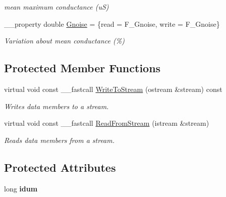 \begin{DoxyCompactItemize}
\begin{DoxyCompactList}\small\item\em mean maximum conductance (u\+S) \end{DoxyCompactList}\item 
\hypertarget{class_t_h_h_current_a62dbf34311e4c433d6bcfda9497982f9}{\+\_\+\+\_\+property double \hyperlink{class_t_h_h_current_a62dbf34311e4c433d6bcfda9497982f9}{Gnoise} = \{read = F\+\_\+\+Gnoise, write = F\+\_\+\+Gnoise\}}\label{class_t_h_h_current_a62dbf34311e4c433d6bcfda9497982f9}

\begin{DoxyCompactList}\small\item\em Variation about mean conductance (\%) \end{DoxyCompactList}\end{DoxyCompactItemize}
\subsection*{Protected Member Functions}
\begin{DoxyCompactItemize}
\item 
\hypertarget{class_t_h_h_current_a28afc4ddd30bbf6a44855c750a98dc8d}{virtual void const \+\_\+\+\_\+fastcall \hyperlink{class_t_h_h_current_a28afc4ddd30bbf6a44855c750a98dc8d}{Write\+To\+Stream} (ostream \&stream) const }\label{class_t_h_h_current_a28afc4ddd30bbf6a44855c750a98dc8d}

\begin{DoxyCompactList}\small\item\em Writes data members to a stream. \end{DoxyCompactList}\item 
\hypertarget{class_t_h_h_current_a9ade3361c30cf11880d13339f7ae1fad}{virtual void const \+\_\+\+\_\+fastcall \hyperlink{class_t_h_h_current_a9ade3361c30cf11880d13339f7ae1fad}{Read\+From\+Stream} (istream \&stream)}\label{class_t_h_h_current_a9ade3361c30cf11880d13339f7ae1fad}

\begin{DoxyCompactList}\small\item\em Reads data members from a stream. \end{DoxyCompactList}\end{DoxyCompactItemize}
\subsection*{Protected Attributes}
\begin{DoxyCompactItemize}
\item 
\hypertarget{class_t_h_h_current_a8938eaa4d33700d8b2de8a2b7ef918e9}{long {\bfseries idum}}\label{class_t_h_h_current_a8938eaa4d33700d8b2de8a2b7ef918e9}

\end{DoxyCompactItemize}
